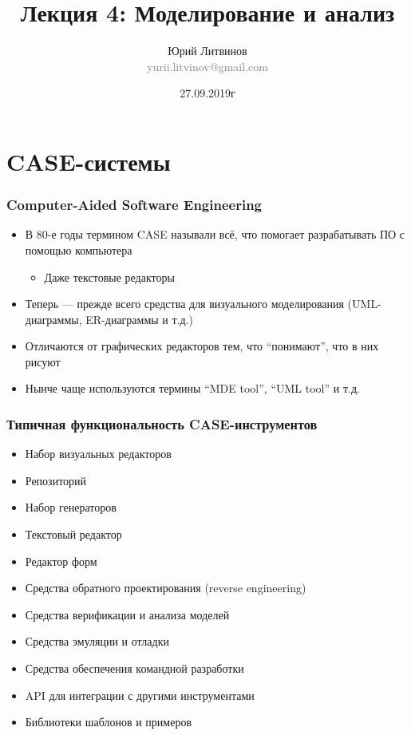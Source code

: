 \documentclass[xetex,mathserif,serif]{beamer}
\title[Моделирование и анализ]{Лекция 4: Моделирование и анализ}
\author[Юрий Литвинов]{Юрий Литвинов\\\small{\textcolor{gray}{yurii.litvinov@gmail.com}}}
\date{27.09.2019г}
\begin{document}
	\frame{\titlepage}

	\section{CASE-системы}
	
	\begin{frame}
		\frametitle{Computer-Aided Software Engineering}
		\begin{itemize}
			\item В 80-е годы термином CASE называли всё, что помогает разрабатывать ПО с помощью компьютера
			\begin{itemize}
				\item Даже текстовые редакторы
			\end{itemize}
			\item Теперь --- прежде всего средства для визуального моделирования (UML-диаграммы, ER-диаграммы и т.д.)
			\item Отличаются от графических редакторов тем, что ``понимают'', что в них рисуют
			\item Нынче чаще используются термины ``MDE tool'', ``UML tool'' и т.д.
		\end{itemize}
	\end{frame}

	\begin{frame}
		\frametitle{Типичная функциональность CASE-инструментов}
		\begin{itemize}
			\item Набор визуальных редакторов
			\item Репозиторий
			\item Набор генераторов
			\item Текстовый редактор
			\item Редактор форм
			\item Средства обратного проектирования (reverse engineering)
			\item Средства верификации и анализа моделей
			\item Средства эмуляции и отладки
			\item Средства обеспечения командной разработки
			\item API для интеграции с другими инструментами
			\item Библиотеки шаблонов и примеров
		\end{itemize}
	\end{frame}
\end{document}
